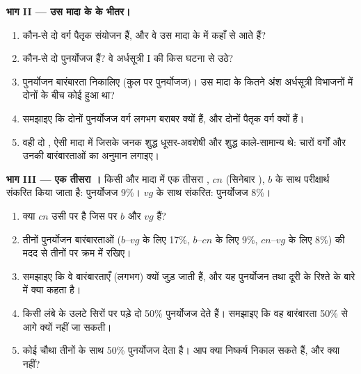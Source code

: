 \begin{problem}
\medskip
\noindent\textbf{भाग II --- उस मादा के  के भीतर।}
\begin{enumerate}[resume]
  \item कौन-से दो वर्ग पैतृक संयोजन हैं, और वे उस मादा के  में
        कहाँ से आते हैं?
  \item कौन-से दो पुनर्योजज हैं? वे अर्धसूत्री I की किस घटना से उठे?
  \item पुनर्योजन बारंबारता निकालिए (कुल पर पुनर्योजज)। उस मादा के कितने
        अंश अर्धसूत्री विभाजनों में दोनों  के बीच कोई  हुआ
        था?
  \item समझाइए कि दोनों पुनर्योजज वर्ग लगभग बराबर क्यों हैं, और दोनों
        पैतृक वर्ग क्यों हैं।
  \item वही दो , ऐसी मादा में जिसके जनक शुद्ध धूसर-अवशेषी और शुद्ध
        काले-सामान्य थे: चारों वर्गों और उनकी बारंबारताओं का अनुमान
        लगाइए।
\end{enumerate}

\medskip
\noindent\textbf{भाग III --- एक तीसरा ।}
किसी और मादा में एक तीसरा , $cn$ (सिनेबार ), $b$ के साथ परीक्षार्थ
संकरित किया जाता है: पुनर्योजज 9\%। $vg$ के साथ संकरित: पुनर्योजज 8\%।
\begin{enumerate}[resume]
  \item क्या $cn$ उसी  पर है जिस पर $b$ और $vg$ हैं?
  \item तीनों पुनर्योजन बारंबारताओं ($b$--$vg$ के लिए 17\%, $b$--$cn$ के
        लिए 9\%, $cn$--$vg$ के लिए 8\%) की मदद से तीनों   पर
        क्रम में रखिए।
  \item समझाइए कि वे बारंबारताएँ (लगभग) क्यों जुड़ जाती हैं, और यह
        पुनर्योजन तथा दूरी के रिश्ते के बारे में क्या कहता है।
  \item किसी लंबे  के उलटे सिरों पर पड़े दो  50\% पुनर्योजज देते
        हैं। समझाइए कि वह बारंबारता 50\% से आगे क्यों नहीं जा सकती।
  \item कोई चौथा  तीनों के साथ 50\% पुनर्योजज देता है। आप क्या निष्कर्ष
        निकाल सकते हैं, और क्या नहीं?
\end{enumerate}


\end{problem}
